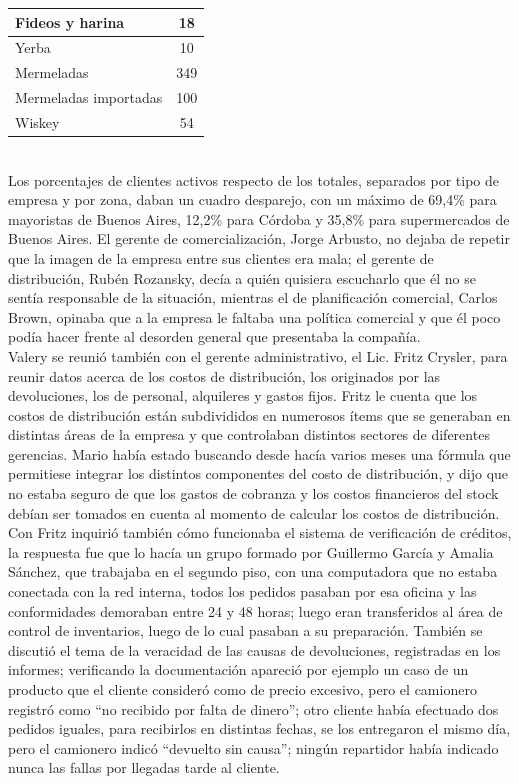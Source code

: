 \documentclass[a4paper,10pt]{article}
\begin{document}
	\begin{tabular}{||l | c ||}
	\hline
	\hline
	Fideos y harina & 18\\
	\hline
	Yerba & 10 \\
	\hline
	Mermeladas & 349\\
	\hline
	Mermeladas importadas & 100 \\
	\hline
	Wiskey & 54\\
	\hline
	\hline
	\end{tabular}\\
	Los porcentajes de clientes activos respecto de los totales, separados por tipo de empresa y por zona, daban un cuadro desparejo, con un máximo de 69,4\% para mayoristas de Buenos Aires, 12,2\% para Córdoba y 35,8\% para supermercados de Buenos Aires. El gerente de comercialización, Jorge Arbusto, no dejaba de repetir que la imagen de la empresa entre sus clientes era mala; el gerente de distribución, Rubén Rozansky, decía a quién quisiera escucharlo que él no se sentía responsable de la situación, mientras el de planificación comercial, Carlos Brown, opinaba que a la empresa le faltaba una política comercial y que él poco podía hacer frente al desorden general que presentaba la compañía.\\
	Valery se reunió también con el gerente administrativo, el Lic. Fritz Crysler, para reunir datos acerca de los costos de distribución, los originados por las devoluciones, los de personal, alquileres y gastos fijos. Fritz le cuenta que los costos de distribución están subdivididos en numerosos ítems que se generaban en distintas áreas de la empresa y que controlaban distintos sectores de diferentes gerencias. Mario había estado buscando desde hacía varios meses una fórmula que permitiese integrar los distintos componentes del costo de distribución, y dijo que no estaba seguro de que los gastos de cobranza y los costos financieros del stock debían ser tomados en cuenta al momento de calcular los costos de distribución. Con Fritz inquirió también cómo funcionaba el sistema de verificación de créditos, la respuesta fue que lo hacía un grupo formado por Guillermo García y Amalia Sánchez, que trabajaba en el segundo piso, con una computadora que no estaba conectada con la red interna, todos los pedidos pasaban por esa oficina y las conformidades demoraban entre 24 y 48 horas; luego eran transferidos al área de control de inventarios, luego de lo cual pasaban a su preparación. También se discutió el tema de la veracidad de las causas de devoluciones, registradas en los informes; verificando la documentación apareció por ejemplo un caso de un producto que el cliente consideró como de precio excesivo, pero el camionero registró como “no recibido por falta de dinero”; otro cliente había efectuado dos pedidos iguales, para recibirlos en distintas fechas, se los entregaron el mismo día, pero el camionero indicó “devuelto sin causa”; ningún repartidor había indicado nunca las fallas por llegadas tarde al cliente.\\
\end{document}
